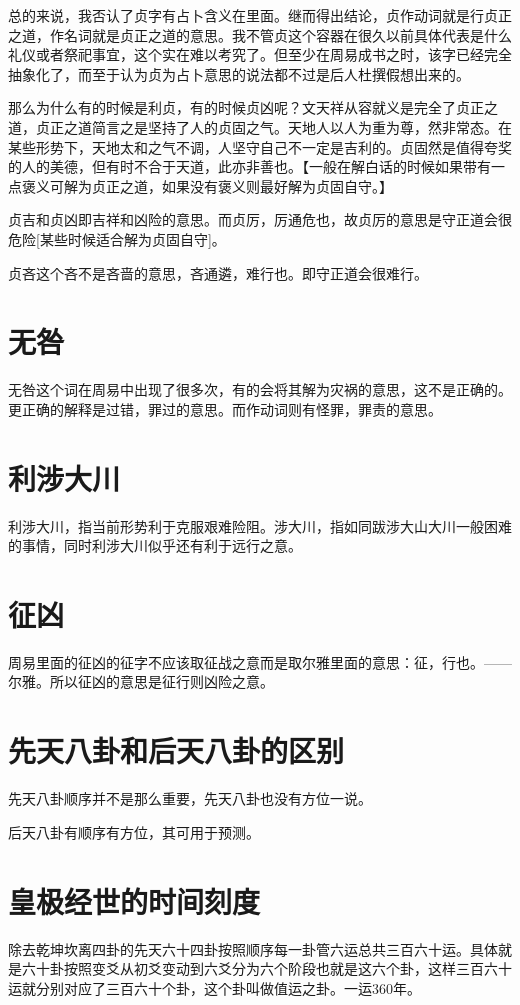 \documentclass[12pt,oneside]{book}
\begin{document}
总的来说，我否认了贞字有占卜含义在里面。继而得出结论，贞作动词就是行贞正之道，作名词就是贞正之道的意思。我不管贞这个容器在很久以前具体代表是什么礼仪或者祭祀事宜，这个实在难以考究了。但至少在周易成书之时，该字已经完全抽象化了，而至于认为贞为占卜意思的说法都不过是后人杜撰假想出来的。

那么为什么有的时候是利贞，有的时候贞凶呢？文天祥从容就义是完全了贞正之道，贞正之道简言之是坚持了人的贞固之气。天地人以人为重为尊，然非常态。在某些形势下，天地太和之气不调，人坚守自己不一定是吉利的。贞固然是值得夸奖的人的美德，但有时不合于天道，此亦非善也。【一般在解白话的时候如果带有一点褒义可解为贞正之道，如果没有褒义则最好解为贞固自守。】

贞吉和贞凶即吉祥和凶险的意思。而贞厉，厉通危也，故贞厉的意思是守正道会很危险[某些时候适合解为贞固自守]。

贞吝这个吝不是吝啬的意思，吝通遴，难行也。即守正道会很难行。


\section{无咎}
无咎这个词在周易中出现了很多次，有的会将其解为灾祸的意思，这不是正确的。更正确的解释是过错，罪过的意思。而作动词则有怪罪，罪责的意思。

\section{利涉大川}
利涉大川，指当前形势利于克服艰难险阻。涉大川，指如同跋涉大山大川一般困难的事情，同时利涉大川似乎还有利于远行之意。

\section{征凶}
周易里面的征凶的征字不应该取征战之意而是取尔雅里面的意思：征，行也。——尔雅。所以征凶的意思是征行则凶险之意。

\section{先天八卦和后天八卦的区别}
先天八卦顺序并不是那么重要，先天八卦也没有方位一说。

后天八卦有顺序有方位，其可用于预测。


\section{皇极经世的时间刻度}
除去乾坤坎离四卦的先天六十四卦按照顺序每一卦管六运总共三百六十运。具体就是六十卦按照变爻从初爻变动到六爻分为六个阶段也就是这六个卦，这样三百六十运就分别对应了三百六十个卦，这个卦叫做值运之卦。一运360年。
\end{document}

